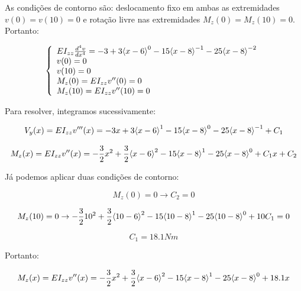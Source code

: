         As condições de contorno são: deslocamento fixo em ambas as extremidades $v(0) = v(10) = 0$ e rotação livre nas extremidades $M_z(0) = M_z(10) = 0$. Portanto:

        \begin{equation*}
            \left\{
            \begin{array}{l}
                EI_{zz}\frac{d^4v}{dx^4} = -3 + 3{\left\langle x-6\right\rangle^{0}} - 15{\left\langle x-8\right\rangle^{-1}} - 25{\left\langle x-8\right\rangle^{-2}}\\
                v(0) = 0\\
                v(10) = 0\\
                M_z(0) = EI_{zz}v''(0) = 0\\
                M_z(10) = EI_{zz}v''(10) = 0
            \end{array}
            \right.
        \end{equation*}

        Para resolver, integramos sucessivamente:

        \begin{equation*}
            V_y(x) = EI_{zz}v'''(x) = -3x + 3{\left\langle x-6\right\rangle^{1}} - 15{\left\langle x-8\right\rangle^{0}} - 25{\left\langle x-8\right\rangle^{-1}} + C_1
        \end{equation*}

        \begin{equation*}
            M_z(x) = EI_{zz}v''(x) = -\frac{3}{2}x^2 + \frac{3}{2}{\left\langle x-6\right\rangle^{2}} - 15{\left\langle x-8\right\rangle^{1}} - 25{\left\langle x-8\right\rangle^{0}} + C_1 x + C_2
        \end{equation*}

        Já podemos aplicar duas condições de contorno:

        \begin{equation*}
            M_z(0) = 0 \rightarrow C_2 = 0
        \end{equation*}

        \begin{equation*}
            M_z(10) = 0 \rightarrow -\frac{3}{2}10^2 + \frac{3}{2}{\left\langle 10-6\right\rangle^{2}} - 15{\left\langle 10-8\right\rangle^{1}} - 25{\left\langle 10-8\right\rangle^{0}} + 10 C_1 = 0
        \end{equation*}

        \begin{equation*}
            C_1 = 18.1 Nm
        \end{equation*}

        Portanto:

        \begin{equation*}
            M_z(x) = EI_{zz}v''(x) = -\frac{3}{2}x^2 + \frac{3}{2}{\left\langle x-6\right\rangle^{2}} - 15{\left\langle x-8\right\rangle^{1}} - 25{\left\langle x-8\right\rangle^{0}} + 18.1 x
        \end{equation*}

